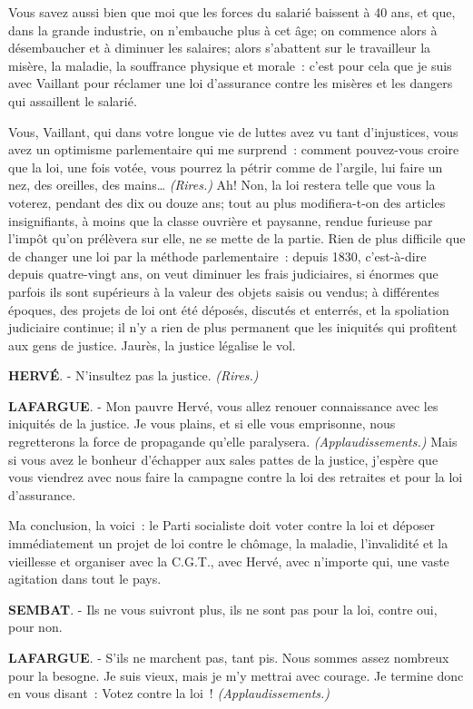 \documentclass[french,twoside]{book} %
\begin{document}
Vous savez aussi bien que moi que les forces du salarié baissent à 40 ans, et que, dans la grande industrie, on n’embauche plus à cet âge; on commence alors à désembaucher et à diminuer les salaires; alors s’abattent sur le travailleur la misère, la maladie, la souffrance physique et morale : c’est pour cela que je suis avec Vaillant pour réclamer une loi d’assurance contre les misères et les dangers qui assaillent le salarié.\par
Vous, Vaillant, qui dans votre longue vie de luttes avez vu tant d’injustices, vous avez un optimisme parlementaire qui me surprend : comment pouvez-vous croire que la loi, une fois votée, vous pourrez la pétrir comme de l’argile, lui faire un nez, des oreilles, des mains… \emph{(Rires.)} Ah! Non, la loi restera telle que vous la voterez, pendant des dix ou douze ans; tout au plus modifiera-t-on des articles insignifiants, à moins que la classe ouvrière et paysanne, rendue furieuse par l’impôt qu’on prélèvera sur elle, ne se mette de la partie. Rien de plus difficile que de changer une loi par la méthode parlementaire : depuis 1830, c’est-à-dire depuis quatre-vingt ans, on veut diminuer les frais judiciaires, si énormes que parfois ils sont supérieurs à la valeur des objets saisis ou vendus; à différentes époques, des projets de loi ont été déposés, discutés et enterrés, et la spoliation judiciaire continue; il n’y a rien de plus permanent que les iniquités qui profitent aux gens de justice. Jaurès, la justice légalise le vol.\par
\textbf{HERVÉ}. - N'insultez pas la justice.\emph{ (Rires.)}\par
\textbf{LAFARGUE}. - Mon pauvre Hervé, vous allez renouer connaissance avec les iniquités de la justice. Je vous plains, et si elle vous emprisonne, nous regretterons la force de propagande qu’elle paralysera. \emph{(Applaudissements.)} Mais si vous avez le bonheur d’échapper aux sales pattes de la justice, j’espère que vous viendrez avec nous faire la campagne contre la loi des retraites et pour la loi d’assurance.\par
Ma conclusion, la voici : le Parti socialiste doit voter contre la loi et déposer immédiatement un projet de loi contre le chômage, la maladie, l’invalidité et la vieillesse et organiser avec la C.G.T., avec Hervé, avec n’importe qui, une vaste agitation dans tout le pays.\par
\textbf{SEMBAT}. - Ils ne vous suivront plus, ils ne sont pas pour la loi, contre oui, pour non.\par
\textbf{LAFARGUE}. - S'ils ne marchent pas, tant pis. Nous sommes assez nombreux pour la besogne. Je suis vieux, mais je m’y mettrai avec courage. Je termine donc en vous disant : Votez contre la loi ! \emph{(Applaudissements.)}
 
\end{document}
